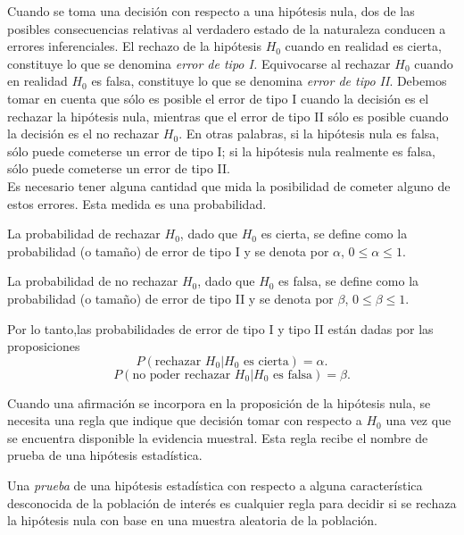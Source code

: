 Cuando se toma una decisión con respecto a una hipótesis nula, dos de las posibles consecuencias relativas al verdadero estado de la naturaleza conducen a errores inferenciales. El rechazo de la hipótesis $H_0$ cuando en realidad es cierta, constituye lo que se denomina \textit{error de tipo I.} Equivocarse al rechazar $H_0$ cuando en realidad $H_0$ es falsa, constituye lo que se denomina \textit{error de tipo II}. Debemos tomar en cuenta que sólo es posible el error de tipo I cuando la decisión es el rechazar la hipótesis nula, mientras que el error de tipo II sólo es posible cuando la decisión es el no rechazar $H_0$. En otras palabras, si la hipótesis nula es falsa, sólo puede cometerse un error de tipo I; si la hipótesis nula realmente es falsa, sólo puede cometerse un error de tipo II. \\
Es necesario tener alguna cantidad que mida la posibilidad de cometer alguno de estos errores. Esta medida es una probabilidad.

\begin{def.}
    La probabilidad de rechazar $H_0$, dado que $H_0$ es cierta, se define como la probabilidad (o tamaño) de error de tipo I y se denota por $\alpha$, $0\leq \alpha\leq 1$.
\end{def.}

\begin{def.}
    La probabilidad de no rechazar $H_0$, dado que $H_0$ es falsa, se define como la probabilidad (o tamaño) de error de tipo II y se denota por $\beta$, $0\leq \beta\leq 1$.
\end{def.}

Por lo tanto,las probabilidades de error de tipo I y tipo II están dadas por las proposiciones 
$$P(\mbox{rechazar }H_0 | H_0 \mbox{ es cierta})=\alpha.$$
$$P(\mbox{no poder rechazar }H_0 | H_0 \mbox{ es falsa})=\beta.$$

Cuando una afirmación se incorpora en la proposición de la hipótesis nula, se necesita una regla que indique que decisión tomar con respecto a $H_0$ una vez que se encuentra disponible la evidencia muestral. Esta regla recibe el nombre de prueba de una hipótesis estadística.

\begin{def.}
    Una \textit{prueba} de una hipótesis estadística con respecto a alguna característica desconocida de la población de interés es cualquier regla para decidir si se rechaza la hipótesis nula con base en una muestra aleatoria de la población.
\end{def.}


